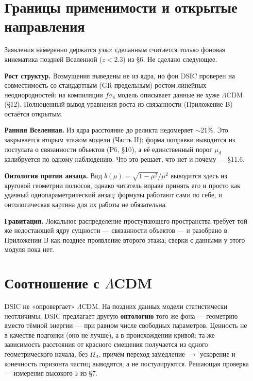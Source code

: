 \documentclass{article}
\begin{document}
\section{Границы применимости и открытые направления}

Заявления намеренно держатся узко: сделанным считается только фоновая кинематика поздней Вселенной ($z < 2.3$) из \S6. Не сделано следующее.

\medskip
\noindent\textbf{Рост структур.} Возмущения выведены не из ядра, но фон DSIC проверен на совместимость со стандартным (GR-предельным) ростом линейных неоднородностей: на компиляции $f\sigma_8$ модель описывает данные не хуже $\Lambda$CDM (\S12). Полноценный вывод уравнения роста из связанности (Приложение B) остаётся открытым.

\medskip
\noindent\textbf{Ранняя Вселенная.} Из ядра расстояние до реликта недомеряет ${\sim}21\%$. Это закрывается вторым этажом модели (Часть II): форма поправки выводится из постулата о связанности объектов (P6, \S10), а её единственный порог $\mu_d$ калибруется по одному наблюдению. Что это решает, что нет и почему --- \S11.6.

\medskip
\noindent\textbf{Онтология против анзаца.} Вид $b(\mu) = \sqrt{1-\mu^2}/\mu^2$ выводится здесь из круговой геометрии полюсов, однако читатель вправе принять его и просто как удачный однопараметрический анзац: формулы работают сами по себе, и онтологическая картина для их работы не обязательна.

\medskip
\noindent\textbf{Гравитация.} Локальное распределение проступающего пространства требует той же недостающей ядру сущности --- связанности объектов --- и разобрано в Приложении B как позднее проявление второго этажа; сверки с данными у этого модуля пока нет.
\section{Соотношение с $\Lambda$CDM}

DSIC не «опровергает» $\Lambda$CDM. На поздних данных модели статистически неотличимы; DSIC предлагает другую \textbf{онтологию} того же фона --- геометрию вместо тёмной энергии --- при равном числе свободных параметров. Ценность не в качестве подгонки (оно не лучше), а в происхождении кривой: та же зависимость расстояния от красного смещения получается из одного геометрического начала, без $\Omega_\Lambda$, причём переход замедление $\to$ ускорение и конечность горизонта частиц выводятся, а не постулируются. Решающая проверка --- измерения высокого $z$ из \S7.
\end{document}
